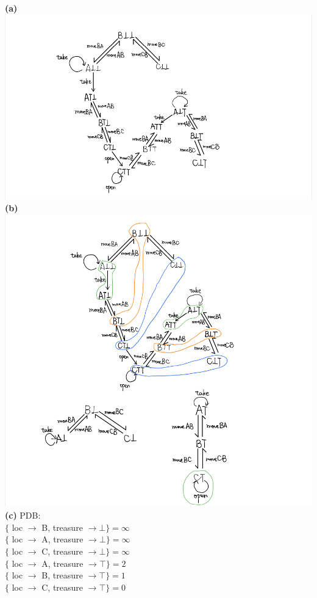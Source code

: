 \documentclass[12pt]{article}
\begin{document}
\textbf{(a)} \\
\includegraphics[width=\textwidth]{figures/7.2a.png}\\
\textbf{(b)} \\
\includegraphics[width=\textwidth]{figures/7.2b.png}
\textbf{(c)} PDB:\\
$\{$ loc $\to$ B, treasure $\to \bot \} = \infty$\\
$\{$ loc $\to$ A, treasure $\to \bot \} = \infty$\\
$\{$ loc $\to$ C, treasure $\to \bot \} = \infty$\\
$\{$ loc $\to$ A, treasure $\to \top \} = 2$\\
$\{$ loc $\to$ B, treasure $\to \top \} = 1$\\
$\{$ loc $\to$ C, treasure $\to \top \} = 0$\\
\end{document}
